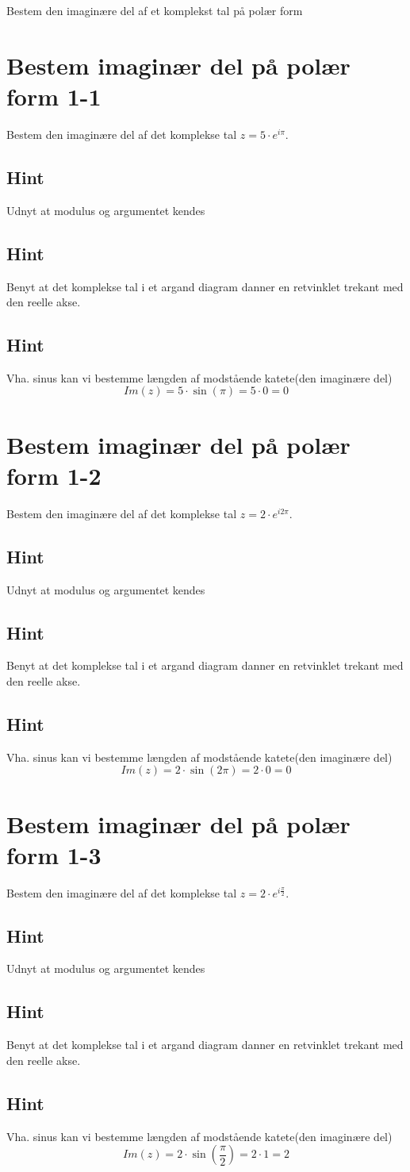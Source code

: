 \documentclass{article}
\newenvironment{exercise}[1]{\newpage\section{#1}}{}
\newcommand{\answerbox}[1]{\fbox{$#1$}}
\newcommand{\hint}{\subsection*{Hint}}
\begin{document}
Bestem den imaginære del af et komplekst tal på polær form
\tableofcontents
\newpage

\begin{exercise}{Bestem imaginær del på polær form 1-1}

Bestem den imaginære del af det komplekse tal $z=5 \cdot e^{i \pi}$.

\answerbox{0}


\hint 

Udnyt at modulus og argumentet kendes


\hint

Benyt at det komplekse tal i et argand diagram danner en retvinklet trekant med den reelle akse. 

\hint 

Vha. sinus kan vi bestemme længden af modstående katete(den imaginære del)
\[
Im(z) =  5 \cdot \sin(\pi) = 5 \cdot 0 = 0
\]

\end{exercise}

\newpage

\begin{exercise}{Bestem imaginær del på polær form 1-2}
	
	Bestem den imaginære del af det komplekse tal $z=2 \cdot e^{i 2\pi}$.
	
	\answerbox{0}
	
	
	\hint 
	
	Udnyt at modulus og argumentet kendes
	
	
	\hint
	
	Benyt at det komplekse tal i et argand diagram danner en retvinklet trekant med den reelle akse. 
	
	\hint 
	
	Vha. sinus kan vi bestemme længden af modstående katete(den imaginære del)
	\[
	Im(z) =  2 \cdot \sin(2\pi) = 2 \cdot 0 = 0
	\]
	
\end{exercise}

\newpage

\begin{exercise}{Bestem imaginær del på polær form 1-3}
	
	Bestem den imaginære del af det komplekse tal $z=2 \cdot e^{i \frac{\pi}{2}}$.
	
	\answerbox{2}
	
	
	\hint 
	
	Udnyt at modulus og argumentet kendes
	
	
	\hint
	
	Benyt at det komplekse tal i et argand diagram danner en retvinklet trekant med den reelle akse. 
	
	\hint 
	
	Vha. sinus kan vi bestemme længden af modstående katete(den imaginære del)
	\[
	Im(z) =  2 \cdot \sin\left(\frac{\pi}{2}\right) = 2 \cdot 1 = 2
	\]
	
\end{exercise}
\end{document}
